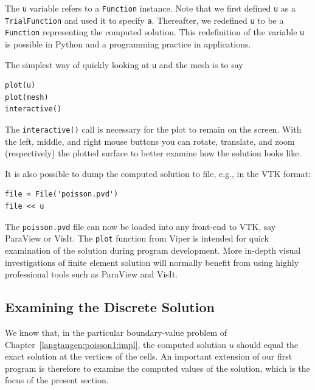 The {\fontsize{12pt}{12pt}\verb!u!} variable refers to
a {\fontsize{12pt}{12pt}\verb!Function!} instance. Note that we first defined {\fontsize{12pt}{12pt}\texttt{u}} as
a {\fontsize{12pt}{12pt}\texttt{TrialFunction}} and used it to specify {\fontsize{12pt}{12pt}\texttt{a}}.
Thereafter, we redefined {\fontsize{12pt}{12pt}\texttt{u}} to be a {\fontsize{12pt}{12pt}\texttt{Function}} representing
the computed solution. This redefinition of the variable {\fontsize{12pt}{12pt}\texttt{u}}
is possible in Python and a programming practice in \fenics{}
applications.

The simplest way of quickly looking at {\fontsize{12pt}{12pt}\texttt{u}} and the mesh
is to say
\begin{Verbatim}[fontsize=\fontsize{10pt}{10pt},tabsize=8,baselinestretch=1.05,
fontfamily=tt,xleftmargin=7mm]
plot(u)
plot(mesh)
interactive()
\end{Verbatim}
\noindent
The {\fontsize{12pt}{12pt}\verb!interactive()!} call is necessary for the plot to remain on the
screen. With the left, middle, and right
mouse buttons you can rotate, translate, and zoom
(respectively) the plotted surface to better examine how the solution looks
like.

It is also possible to dump the computed solution to file, e.g., in the
VTK format:
\begin{Verbatim}[fontsize=\fontsize{10pt}{10pt},tabsize=8,baselinestretch=1.05,
fontfamily=tt,xleftmargin=7mm]
file = File('poisson.pvd')
file << u
\end{Verbatim}
\noindent
{}
The {\fontsize{12pt}{12pt}\verb!poisson.pvd!} file can now be loaded into any
front-end to VTK, say ParaView or VisIt. The {\fontsize{12pt}{12pt}\texttt{plot}} function from Viper
is intended for quick examination of the solution during program development.
More in-depth visual investigations of finite element solution will
normally benefit from using highly professional tools such as ParaView and
VisIt.


\subsection{Examining the Discrete Solution}
\label{langtangen:poisson1:verify1}

We know that, in the particular boundary-value problem of Chapter~\ref{langtangen:poisson1:impl}, the computed solution $u$ should equal the exact
solution at the vertices of the cells.
An important extension of our first program is therefore to
examine the computed values of the solution, which is the focus of the
present section.

